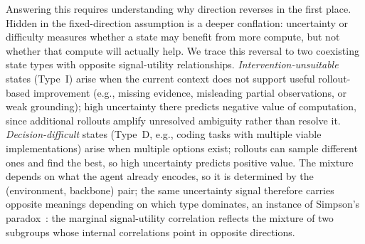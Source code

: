 Answering this requires understanding why direction reverses in the first place. Hidden in the fixed-direction assumption is a deeper conflation: uncertainty or difficulty measures whether a state may benefit from more compute, but not whether that compute will actually help.
We trace this reversal to two coexisting state types with opposite signal-utility relationships. \emph{Intervention-unsuitable} states (Type~I) arise when the current context does not support useful rollout-based improvement (e.g., missing evidence, misleading partial observations, or weak grounding); high uncertainty there predicts negative value of computation, since additional rollouts amplify unresolved ambiguity rather than resolve it. \emph{Decision-difficult} states (Type~D, e.g., coding tasks with multiple viable implementations) arise when multiple options exist; rollouts can sample different ones and find the best, so high uncertainty predicts positive value. The mixture depends on what the agent already encodes, so it is determined by the (environment, backbone) pair; the same uncertainty signal therefore carries opposite meanings depending on which type dominates, an instance of Simpson's paradox~\cite{simpson1951interpretation, kdd2023simpson}: the marginal signal-utility correlation reflects the mixture of two subgroups whose internal correlations point in opposite directions.

